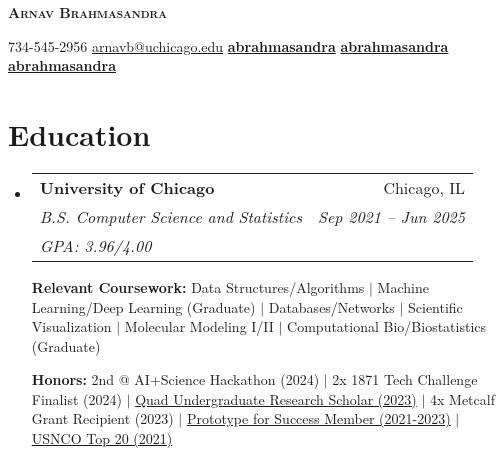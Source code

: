 \documentclass[letterpaper,11pt]{article}
\makeatletter
\newcommand{\phonesymbol}{\faPhone}
\newcommand{\homepagesymbol}{\faChain}
\newcommand{\linkedinsymbol}{\faLinkedin}
\newcommand{\githubsymbol}{\faGithub}
\newcommand{\mailsymbol}{\faEnvelope}
\newcommand{\printinfo}[2]{\mbox{{#1}\hspace{0.5em}#2\hspace{0.5em}}}
\newcommand{\mailaddress}[1]{\printinfo{\mailsymbol}{#1}}
\newcommand{\phone}[1]{\printinfo{\phonesymbol}{#1}}
\newcommand{\homepage}[1]{\printinfo{\homepagesymbol}{#1}}
\newcommand{\linkedin}[1]{\printinfo{\linkedinsymbol}{#1}}
\newcommand{\github}[1]{\printinfo{\githubsymbol}{#1}}
\newcommand{\courseItem}[1]{
    {\small #1 \vspace{-2pt}}
}
\newcommand{\honorsItem}[1]{
    {\small #1 \vspace{-2pt}}
}
\newcommand{\resumeEduSubheading}[5]{
  \vspace{-2pt}\item
    \begin{tabular*}{0.97\textwidth}[t]{l@{\extracolsep{\fill}}r}
      \textbf{#1} & #2 \\
      \textit{\small#3} & \textit{\small #4} \\
      \textit{\small#5}
    \end{tabular*}\vspace{-7pt}
}
\newcommand{\resumeSubHeadingListStart}{\begin{itemize}[leftmargin=0.15in, label={}]}
\newcommand{\resumeSubHeadingListEnd}{\end{itemize}}
\makeatother
\begin{document}

\begin{center}
    \textbf{\Huge \scshape Arnav Brahmasandra} \\ \vspace{1pt}
    
    \phone{734-545-2956} 
    \mailaddress{\href{mailto:arnavb@uchicago.edu}{arnavb@uchicago.edu}}
    \linkedin{\href{https://www.linkedin.com/in/abrahmasandra/}{\textbf{abrahmasandra}}}
    \github{\href{https://github.com/abrahmasandra}{\textbf{abrahmasandra}}}
    \homepage{\href{https://abrahmasandra.github.io/}{\textbf{abrahmasandra}}}
\end{center}


\section{Education}
  \resumeSubHeadingListStart
    \resumeEduSubheading
      {University of Chicago}{Chicago, IL}
      {B.S. Computer Science and Statistics}{Sep 2021 -- Jun 2025}{GPA: 3.96/4.00} \newline

    \textbf{Relevant Coursework:} \courseItem{Data Structures/Algorithms $|$ Machine Learning/Deep Learning (Graduate) $|$ Databases/Networks $|$ Scientific Visualization $|$ Molecular Modeling I/II $|$ Computational Bio/Biostatistics (Graduate)}
    
    \textbf{Honors:} \honorsItem{2nd @ AI+Science Hackathon (2024) $|$ 2x 1871 Tech Challenge Finalist (2024) $|$ \href{https://ugradresearchsymposium.omeka.net/items/show/120}{Quad Undergraduate Research Scholar (2023)} $|$ 4x Metcalf Grant Recipient (2023) $|$ \href{https://careeradvancement.uchicago.edu/careers-in/engineering/prototype-for-success/class-of-2025}{Prototype for Success Member (2021-2023)} $|$ \href{https://www.acs.org/content/acs/en/pressroom/newsreleases/2021/may/2021-chemistry-olympiad-virtual-study-camp-students-named.html}{USNCO Top 20 (2021)}}
  \resumeSubHeadingListEnd
\end{document}
